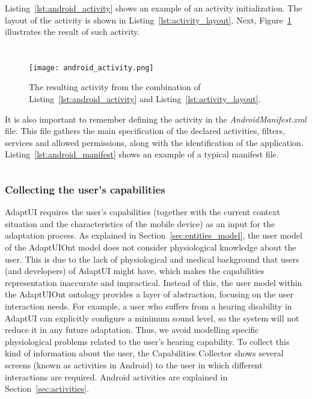 Listing~\ref{lst:android_activity} shows an example of an activity initialization.
The layout of the activity is shown in Listing~\ref{lst:activity_layout}. Next,
Figure~\ref{fig:android_activity} illustrates the result of such activity.

\inputminted[linenos=true, fontsize=\footnotesize, frame=lines]{java}{4_system_architecture/android_activity.java}

\inputminted[linenos=true, fontsize=\footnotesize, frame=lines]{xml}{4_system_architecture/activity_layout.xml}

\begin{figure}
\centering
\texttt{[image: android\_activity.png]}
\caption{The resulting activity from the combination of Listing~\ref{lst:android_activity} and
Listing~\ref{lst:activity_layout}.}
\label{fig:android_activity}
\end{figure}

It is also important to remember defining the activity in the \textit{AndroidManifest.xml}
file. This file gathers the main specification of the declared activities, filters,
services and allowed permissions, along with the identification of the application.
Listing~\ref{lst:android_manifest} shows an example of a typical manifest file.

\inputminted[linenos=true, fontsize=\footnotesize, frame=lines]{xml}{4_system_architecture/android_manifest.xml}

\subsubsection{Collecting the user's capabilities}
\label{sec:user_capabilities}

AdaptUI requires the user's capabilities (together with the current context
situation and the characteristics of the mobile device) as an input  for the
adaptation process. As explained in Section~\ref{sec:entities_model}, the user
model of the AdaptUIOnt model does not consider physiological knowledge about
the user. This is due to the lack of physiological and medical background that
users (and developers) of AdaptUI might have, which makes the capabilities
representation inaccurate and impractical. Instead of this, the user model
within the AdaptUIOnt ontology provides a layer of abstraction, focusing on the
user interaction needs. For example, a user who suffers from a hearing disability
in AdaptUI can explicitly configure a minimum sound level, so the system will
not reduce it in any future adaptation. Thus, we avoid modelling specific
physiological problems related to the user's hearing capability. To collect this
kind of information about the user, the Capabilities Collector shows several
screens (known as activities in Android) to the user in which different
interactions are required. Android activities are explained in Section~\ref{sec:activities}.

